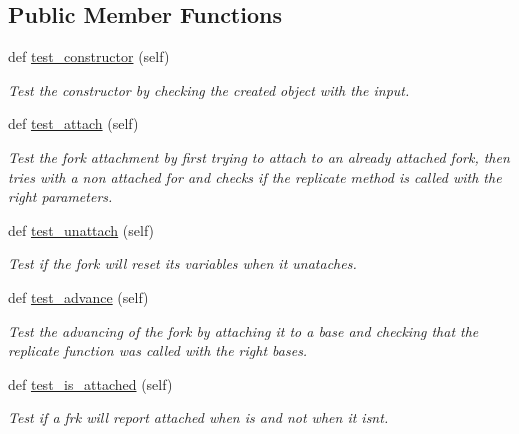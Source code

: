 \subsection*{Public Member Functions}
\begin{DoxyCompactItemize}
\item 
def \mbox{\hyperlink{classReDyMo_1_1test_1_1test__replication__fork_1_1test__replication__fork_a56e666d191e78294a72a90804a4e70b0}{test\+\_\+constructor}} (self)
\begin{DoxyCompactList}\small\item\em Test the constructor by checking the created object with the input. \end{DoxyCompactList}\item 
def \mbox{\hyperlink{classReDyMo_1_1test_1_1test__replication__fork_1_1test__replication__fork_a318f9d99694530a49fd031659d016e20}{test\+\_\+attach}} (self)
\begin{DoxyCompactList}\small\item\em Test the fork attachment by first trying to attach to an already attached fork, then tries with a non attached for and checks if the replicate method is called with the right parameters. \end{DoxyCompactList}\item 
def \mbox{\hyperlink{classReDyMo_1_1test_1_1test__replication__fork_1_1test__replication__fork_a47ebd7572d932a0ac473c2c4e3b67d43}{test\+\_\+unattach}} (self)
\begin{DoxyCompactList}\small\item\em Test if the fork will reset its variables when it unataches. \end{DoxyCompactList}\item 
def \mbox{\hyperlink{classReDyMo_1_1test_1_1test__replication__fork_1_1test__replication__fork_a29b0f8fb24e51bb7de864e4fee8da905}{test\+\_\+advance}} (self)
\begin{DoxyCompactList}\small\item\em Test the advancing of the fork by attaching it to a base and checking that the replicate function was called with the right bases. \end{DoxyCompactList}\item 
def \mbox{\hyperlink{classReDyMo_1_1test_1_1test__replication__fork_1_1test__replication__fork_a187dd908541c4bf18642ca5891f05564}{test\+\_\+is\+\_\+attached}} (self)
\begin{DoxyCompactList}\small\item\em Test if a frk will report attached when is and not when it isn\textquotesingle{}t. \end{DoxyCompactList}\end{DoxyCompactItemize}


